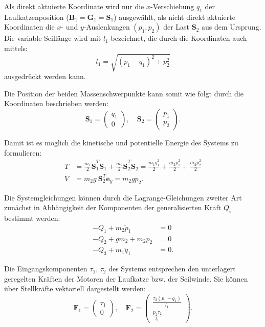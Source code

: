 Als direkt aktuierte Koordinate wird nur die $x$-Verschiebung $q_1$ der Laufkatzenposition ($\mathbf{B}_1 = \mathbf{G}_1 = \mathbf{S}_1$) ausgewählt, als nicht direkt aktuierte Koordinaten die $x$- und $y$-Auslenkungen $(p_1, p_2)$ der Last $\mathbf{S}_2$ aus dem Ursprung. Die variable Seillänge wird mit $l_1$ bezeichnet, die durch die Koordinaten auch mittels:
\begin{equation}
	l_1 = \sqrt{(p_1 - q_1)^2 + p_2^2}
\end{equation}
ausgedrückt werden kann.

Die Position der beiden Massenschwerpunkte kann somit wie folgt durch die Koordinaten beschrieben werden:
\begin{equation}
	\mathbf{S}_1 =
	\begin{pmatrix}
		q_1 \\
		0
	\end{pmatrix}, 
	\quad
	\mathbf{S}_2 =
	\begin{pmatrix}
		p_1 \\
		p_2
	\end{pmatrix}.
\end{equation}

Damit ist es möglich die kinetische und potentielle Energie des Systems zu formulieren:
\begin{align}
	T &= \frac{m_1}{2} \dot{\mathbf{S}}_1^T \dot{\mathbf{S}}_1 + \frac{m_2}{2} \dot{\mathbf{S}}_2^T \dot{\mathbf{S}}_2 = \frac{m_{1} \dot{q}_{1}^{2}}{2} + \frac{m_{2} \dot{p}_{1}^{2}}{2} + \frac{m_{2} \dot{p}_{2}^{2}}{2} \\
	V &= m_2 g \ \mathbf{S}_2^T \mathbf{e}_y = m_{2} g p_{2}.
\end{align}

Die Systemgleichungen können durch die Lagrange-Gleichungen zweiter Art zunächst in Abhängigkeit der Komponenten der generalisierten Kraft $Q_i$ bestimmt werden:
\begin{subequations}
	\begin{align}
		- Q_{1} + m_{2} \ddot{p}_{1} &= 0\\
		- Q_{2} + g m_{2} + m_{2} \ddot{p}_{2} &= 0\\
		- Q_{3} + m_{1} \ddot{q}_{1} &= 0.
	\end{align}
\end{subequations}


Die Eingangskomponenten $\tau_1$, $\tau_2$ des Systems entsprechen den unterlagert geregelten Kräften der Motoren der Laufkatze bzw. der Seilwinde. Sie können über Stellkräfte vektoriell dargestellt werden:
\begin{equation}
	\mathbf{F}_1 =
	\left(\begin{matrix}
		\tau_{1} \\
		0
	\end{matrix}\right), \quad
	\mathbf{F}_2 =
	\left(\begin{matrix}
		\frac{\tau_{2} \left(p_{1} - q_{1}\right)}{l_{1}}\\
		\frac{p_{2} \tau_{2}}{l_{1}}
	\end{matrix}\right).
\end{equation}

